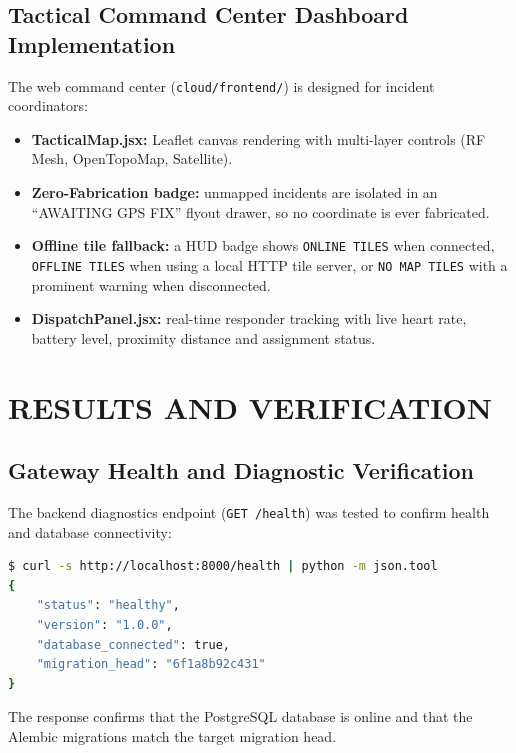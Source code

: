 \documentclass[12pt,a4paper]{report}
\begin{document}
\section{Tactical Command Center Dashboard Implementation}
The web command center (\texttt{cloud/frontend/}) is designed for incident coordinators:
\begin{itemize}
    \item \textbf{TacticalMap.jsx:} Leaflet canvas rendering with multi-layer controls (RF Mesh, OpenTopoMap, Satellite).
    \item \textbf{Zero-Fabrication badge:} unmapped incidents are isolated in an ``AWAITING GPS FIX'' flyout drawer, so no coordinate is ever fabricated.
    \item \textbf{Offline tile fallback:} a HUD badge shows \texttt{ONLINE TILES} when connected, \texttt{OFFLINE TILES} when using a local HTTP tile server, or \texttt{NO MAP TILES} with a prominent warning when disconnected.
    \item \textbf{DispatchPanel.jsx:} real-time responder tracking with live heart rate, battery level, proximity distance and assignment status.
\end{itemize}

\chapter{RESULTS AND VERIFICATION}

\section{Gateway Health and Diagnostic Verification}
The backend diagnostics endpoint (\texttt{GET /health}) was tested to confirm health and database connectivity:

\begin{lstlisting}[language=bash,caption={Real Execution Output -- Health Diagnostic Endpoint}]
$ curl -s http://localhost:8000/health | python -m json.tool
{
    "status": "healthy",
    "version": "1.0.0",
    "database_connected": true,
    "migration_head": "6f1a8b92c431"
}
\end{lstlisting}
The response confirms that the PostgreSQL database is online and that the Alembic migrations match the target migration head.
\end{document}

